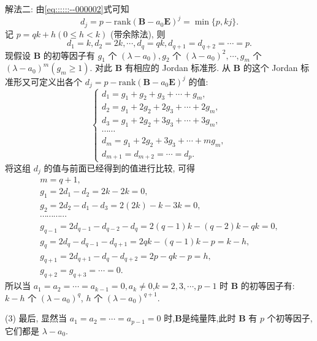 \documentclass[../../main.tex]{subfiles}
\begin{document}
\begin{solution}
{\color{blue}解法二:}
由\eqref{eq::::::--000002}式可知
\[
d_j = p - \mathrm{rank}(\boldsymbol{B} - a_0\boldsymbol{E})^j = \min\{p, kj\}.
\]
记 $p = qk + h(0 \leqslant h < k)$ (带余除法), 则
\[
d_1 = k, d_2 = 2k, \cdots, d_q = qk, d_{q+1} = d_{q+2} = \cdots = p.
\]
现假设 $\boldsymbol{B}$ 的初等因子有 $g_1$ 个 $(\lambda - a_0), g_2$ 个 $(\lambda - a_0)^2, \cdots, g_m$ 个 $(\lambda - a_0)^m(g_m \geqslant 1)$. 对此 $\boldsymbol{B}$ 有相应的 Jordan 标准形. 从 $\boldsymbol{B}$ 的这个 Jordan 标准形又可定义出各个 $d_j = p - \mathrm{rank}(\boldsymbol{B} - a_0\boldsymbol{E})^j$ 的值:
\[
\begin{cases} 
d_1 = g_1 + g_2 + g_3 + \cdots + g_m, \\
d_2 = g_1 + 2g_2 + 2g_3 + \cdots + 2g_m, \\
d_3 = g_1 + 2g_2 + 3g_3 + \cdots + 3g_m, \\
\cdots \cdots \\
d_m = g_1 + 2g_2 + 3g_3 + \cdots + mg_m, \\
d_{m+1} = d_{m+2} = \cdots = d_p.
\end{cases}
\]
将这组 $d_j$ 的值与前面已经得到的值进行比较, 可得
\begin{gather*}
m=q+1,
\\
g_1=2d_1-d_2=2k-2k=0,
\\
g_2=2d_2-d_1-d_3=2(2k)-k-3k=0,
\\
\cdots \cdots \cdots \cdots 
\\
g_{q-1}=2d_{q-1}-d_{q-2}-d_q=2(q-1)k-(q-2)k-qk=0,
\\
g_q=2d_q-d_{q-1}-d_{q+1}=2qk-(q-1)k-p=k-h,
\\
g_{q+1}=2d_{q+1}-d_q-d_{q+2}=2p-qk-p=h,
\\
g_{q+2}=g_{q+3}=\cdots =0.
\end{gather*}
所以当 $a_1 = a_2 = \cdots = a_{k-1} = 0, a_k \neq 0$,$k=2,3,\cdots,p-1$ 时 $\boldsymbol{B}$ 的初等因子有: $k - h$ 个 $(\lambda - a_0)^q$, $h$ 个 $(\lambda - a_0)^{q+1}$.

(3) 最后, 显然当 $a_1 = a_2 = \cdots = a_{p-1} = 0$ 时,$\boldsymbol{B}$是纯量阵,此时 $\boldsymbol{B}$ 有 $p$ 个初等因子, 它们都是 $\lambda - a_0$.
\end{solution}
\end{document}
